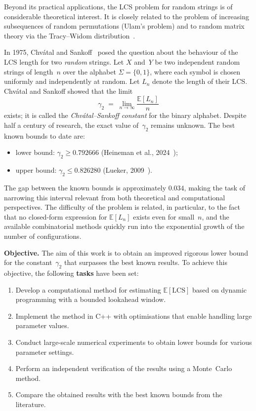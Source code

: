 \documentclass[12pt,a4paper]{article}
\begin{document}
Beyond its practical applications, the LCS problem for random strings is of considerable theoretical interest.
It is closely related to the problem of increasing subsequences of random permutations (Ulam's problem) and to random matrix theory via the Tracy--Widom distribution~\cite{steele1986}.

In 1975, Chv\'{a}tal and Sankoff~\cite{chvatal1975} posed the question about the behaviour of the LCS length for two \emph{random} strings.
Let $X$ and~$Y$ be two independent random strings of length~$n$ over the alphabet $\Sigma = \{0,1\}$, where each symbol is chosen uniformly and independently at random.
Let $L_n$ denote the length of their LCS.
Chv\'{a}tal and Sankoff showed that the limit
\[
  \gamma_2 \;=\; \lim_{n \to \infty} \frac{\mathbb{E}[L_n]}{n}
\]
exists; it is called the \emph{Chv\'{a}tal--Sankoff constant} for the binary alphabet.
Despite half a century of research, the exact value of~$\gamma_2$ remains unknown.
The best known bounds to date are:
\begin{itemize}
  \item lower bound: $\gamma_2 \geq 0.792666$ (Heineman et al., 2024~\cite{heineman2024});
  \item upper bound: $\gamma_2 \leq 0.826280$ (Lueker, 2009~\cite{lueker2009}).
\end{itemize}
The gap between the known bounds is approximately $0.034$, making the task of narrowing this interval relevant from both theoretical and computational perspectives.
The difficulty of the problem is related, in particular, to the fact that no closed-form expression for $\mathbb{E}[L_n]$ exists even for small~$n$, and the available combinatorial methods quickly run into the exponential growth of the number of configurations.

\textbf{Objective.} The aim of this work is to obtain an improved rigorous lower bound for the constant~$\gamma_2$ that surpasses the best known results.
To achieve this objective, the following \textbf{tasks} have been set:
\begin{enumerate}
  \item Develop a computational method for estimating $\mathbb{E}[\mathrm{LCS}]$ based on dynamic programming with a bounded lookahead window.
  \item Implement the method in C++ with optimisations that enable handling large parameter values.
  \item Conduct large-scale numerical experiments to obtain lower bounds for various parameter settings.
  \item Perform an independent verification of the results using a Monte~Carlo method.
  \item Compare the obtained results with the best known bounds from the literature.
\end{enumerate}
\end{document}
